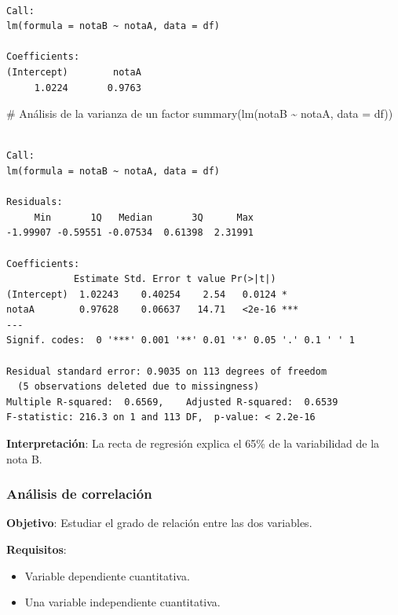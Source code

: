 \documentclass[
  a4paper,
]{scrreport}
\newenvironment{Shaded}{\begin{snugshade}}{\end{snugshade}}
\newcommand{\AttributeTok}[1]{\textcolor[rgb]{0.40,0.45,0.13}{#1}}
\newcommand{\CommentTok}[1]{\textcolor[rgb]{0.37,0.37,0.37}{#1}}
\newcommand{\FunctionTok}[1]{\textcolor[rgb]{0.28,0.35,0.67}{#1}}
\newcommand{\NormalTok}[1]{\textcolor[rgb]{0.00,0.23,0.31}{#1}}
\newcommand{\SpecialCharTok}[1]{\textcolor[rgb]{0.37,0.37,0.37}{#1}}
\providecommand{\tightlist}{%
  \setlength{\itemsep}{0pt}\setlength{\parskip}{0pt}}\usepackage{longtable,booktabs,array}
\theoremstyle{definition}
\theoremstyle{definition}
\theoremstyle{remark}
\begin{document}
\begin{verbatim}

Call:
lm(formula = notaB ~ notaA, data = df)

Coefficients:
(Intercept)        notaA  
     1.0224       0.9763  
\end{verbatim}

\begin{Shaded}
\begin{Highlighting}[]
\CommentTok{\# Análisis de la varianza de un factor}
\FunctionTok{summary}\NormalTok{(}\FunctionTok{lm}\NormalTok{(notaB }\SpecialCharTok{\textasciitilde{}}\NormalTok{ notaA, }\AttributeTok{data =}\NormalTok{ df))}
\end{Highlighting}
\end{Shaded}

\begin{verbatim}

Call:
lm(formula = notaB ~ notaA, data = df)

Residuals:
     Min       1Q   Median       3Q      Max 
-1.99907 -0.59551 -0.07534  0.61398  2.31991 

Coefficients:
            Estimate Std. Error t value Pr(>|t|)    
(Intercept)  1.02243    0.40254    2.54   0.0124 *  
notaA        0.97628    0.06637   14.71   <2e-16 ***
---
Signif. codes:  0 '***' 0.001 '**' 0.01 '*' 0.05 '.' 0.1 ' ' 1

Residual standard error: 0.9035 on 113 degrees of freedom
  (5 observations deleted due to missingness)
Multiple R-squared:  0.6569,    Adjusted R-squared:  0.6539 
F-statistic: 216.3 on 1 and 113 DF,  p-value: < 2.2e-16
\end{verbatim}

\textbf{Interpretación}: La recta de regresión explica el 65\% de la
variabilidad de la nota B.

\subsubsection{Análisis de
correlación}\label{anuxe1lisis-de-correlaciuxf3n}

\textbf{Objetivo}: Estudiar el grado de relación entre las dos
variables.

\textbf{Requisitos}:

\begin{itemize}
\tightlist
\item
  Variable dependiente cuantitativa.
\item
  Una variable independiente cuantitativa.
\end{itemize}
\end{document}
